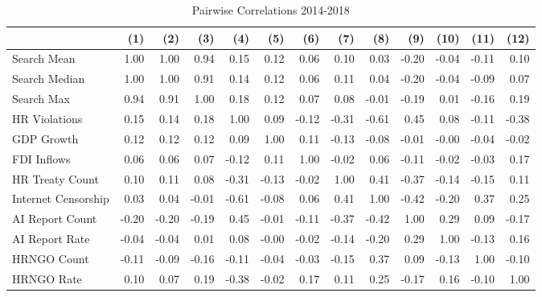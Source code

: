 \begin{table}[ht]
\centering
\begin{tabular}{|l|rrrrrrrrrrrr|}
  \hline
 & (1) & (2) & (3) & (4) & (5) & (6) & (7) & (8) & (9) & (10) & (11) & (12) \\ 
  \hline
Search Mean & 1.00 & 1.00 & 0.94 & 0.15 & 0.12 & 0.06 & 0.10 & 0.03 & -0.20 & -0.04 & -0.11 & 0.10 \\ 
  Search Median & 1.00 & 1.00 & 0.91 & 0.14 & 0.12 & 0.06 & 0.11 & 0.04 & -0.20 & -0.04 & -0.09 & 0.07 \\ 
  Search Max & 0.94 & 0.91 & 1.00 & 0.18 & 0.12 & 0.07 & 0.08 & -0.01 & -0.19 & 0.01 & -0.16 & 0.19 \\ 
  HR Violations & 0.15 & 0.14 & 0.18 & 1.00 & 0.09 & -0.12 & -0.31 & -0.61 & 0.45 & 0.08 & -0.11 & -0.38 \\ 
  GDP Growth & 0.12 & 0.12 & 0.12 & 0.09 & 1.00 & 0.11 & -0.13 & -0.08 & -0.01 & -0.00 & -0.04 & -0.02 \\ 
  FDI Inflows & 0.06 & 0.06 & 0.07 & -0.12 & 0.11 & 1.00 & -0.02 & 0.06 & -0.11 & -0.02 & -0.03 & 0.17 \\ 
  HR Treaty Count & 0.10 & 0.11 & 0.08 & -0.31 & -0.13 & -0.02 & 1.00 & 0.41 & -0.37 & -0.14 & -0.15 & 0.11 \\ 
  Internet Censorship & 0.03 & 0.04 & -0.01 & -0.61 & -0.08 & 0.06 & 0.41 & 1.00 & -0.42 & -0.20 & 0.37 & 0.25 \\ 
  AI Report Count & -0.20 & -0.20 & -0.19 & 0.45 & -0.01 & -0.11 & -0.37 & -0.42 & 1.00 & 0.29 & 0.09 & -0.17 \\ 
  AI Report Rate & -0.04 & -0.04 & 0.01 & 0.08 & -0.00 & -0.02 & -0.14 & -0.20 & 0.29 & 1.00 & -0.13 & 0.16 \\ 
  HRNGO Count & -0.11 & -0.09 & -0.16 & -0.11 & -0.04 & -0.03 & -0.15 & 0.37 & 0.09 & -0.13 & 1.00 & -0.10 \\ 
  HRNGO Rate & 0.10 & 0.07 & 0.19 & -0.38 & -0.02 & 0.17 & 0.11 & 0.25 & -0.17 & 0.16 & -0.10 & 1.00 \\ 
   \hline
\end{tabular}
\caption{Pairwise Correlations 2014-2018} 
\end{table}
